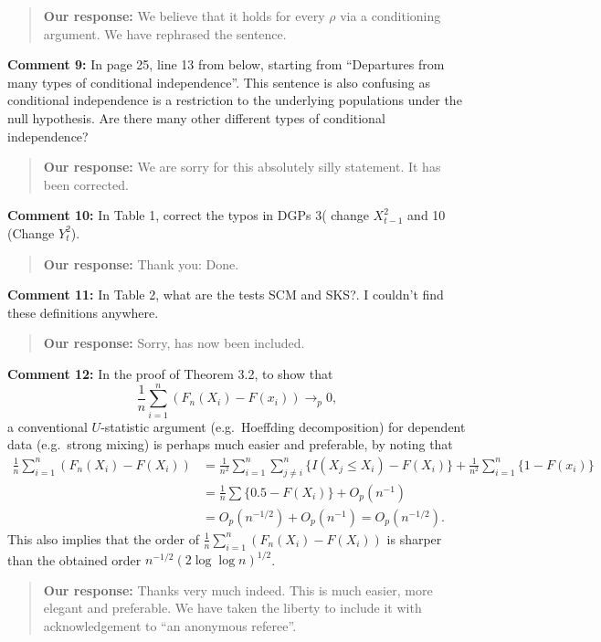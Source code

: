 \documentclass[
  12pt,
  letterpaper]{article}
\numberwithin{equation}{section}
\begin{document}
\begin{quote}
\textbf{Our response:} We believe that it holds for every \(\rho\) via a conditioning argument. We have rephrased the sentence.
\end{quote}

\textbf{Comment 9:} In page 25, line 13 from below, starting from ``Departures from many types of conditional independence''. This sentence is also confusing as conditional independence is a restriction to the underlying populations under the null hypothesis. Are there many other different types of conditional independence?

\begin{quote}
\textbf{Our response:} We are sorry for this absolutely silly statement. It has been corrected.
\end{quote}

\textbf{Comment 10:} In Table 1, correct the typos in DGPs 3( change \(X_{t-1}^2\) and 10 (Change \(Y_t^2\)).

\begin{quote}
\textbf{Our response:} Thank you: Done.
\end{quote}

\textbf{Comment 11:} In Table 2, what are the tests SCM and SKS?. I couldn't find these definitions anywhere.

\begin{quote}
\textbf{Our response:} Sorry, has now been included.
\end{quote}

\textbf{Comment 12:} In the proof of Theorem 3.2, to show that
\[
\frac{1}{n}\sum_{i=1}^{n}(F_n(X_i)-F(x_i)) \to_p 0,
\]
a conventional \(U\)-statistic argument (e.g.~Hoeffding decomposition) for dependent data (e.g.~strong mixing) is perhaps much easier and preferable, by noting that
\begin{align*}
\frac{1}{n}\sum_{i=1}^{n}(F_n(X_i)-F(X_i)) &= \frac{1}{n^2}\sum_{i=1}^{n}\sum_{j \neq i}^{n}\{I(X_j \leq X_i)-F(X_i)\}+\frac{1}{n^2}\sum_{i=1}^{n}\{1-F(x_i)\} \\
& = \frac{1}{n}\sum\{0.5 - F(X_i)\} + O_p(n^{-1}) \\
&= O_p(n^{-1/2})+O_p(n^{-1}) = O_p(n^{-1/2}).
\end{align*}
This also implies that the order of \(\frac{1}{n}\sum_{i=1}^{n}(F_n(X_i)-F(X_i))\) is sharper than the obtained order \(n^{-1/2}(2 \log \log n)^{1/2}\).

\begin{quote}
\textbf{Our response:} Thanks very much indeed. This is much easier, more elegant and preferable. We have taken the liberty to include it with acknowledgement to ``an anonymous referee''.
\end{quote}
\end{document}
